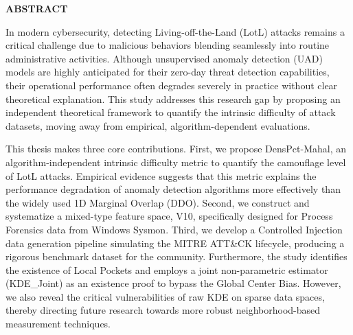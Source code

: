 ﻿\documentclass[../main.tex]{subfiles}
\begin{document}
\begin{center}
    \Large{\textbf{ABSTRACT}}\\
\end{center}
\vspace{0.5cm}

In modern cybersecurity, detecting Living-off-the-Land (LotL) attacks remains a critical challenge due to malicious behaviors blending seamlessly into routine administrative activities. Although unsupervised anomaly detection (UAD) models are highly anticipated for their zero-day threat detection capabilities, their operational performance often degrades severely in practice without clear theoretical explanation. This study addresses this research gap by proposing an independent theoretical framework to quantify the intrinsic difficulty of attack datasets, moving away from empirical, algorithm-dependent evaluations.

This thesis makes three core contributions. First, we propose DensPct-Mahal, an algorithm-independent intrinsic difficulty metric to quantify the camouflage level of LotL attacks. Empirical evidence suggests that this metric explains the performance degradation of anomaly detection algorithms more effectively than the widely used 1D Marginal Overlap (DDO). Second, we construct and systematize a mixed-type feature space, V10, specifically designed for Process Forensics data from Windows Sysmon. Third, we develop a Controlled Injection data generation pipeline simulating the MITRE ATT\&CK lifecycle, producing a rigorous benchmark dataset for the community. Furthermore, the study identifies the existence of Local Pockets and employs a joint non-parametric estimator (KDE\_Joint) as an existence proof to bypass the Global Center Bias. However, we also reveal the critical vulnerabilities of raw KDE on sparse data spaces, thereby directing future research towards more robust neighborhood-based measurement techniques.
\end{document}
